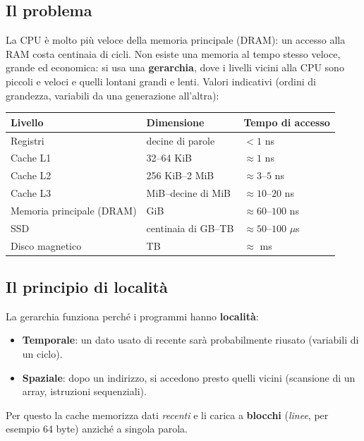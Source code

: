 \subsection{Il problema}
La CPU è molto più veloce della memoria principale (DRAM): un accesso alla RAM costa centinaia di cicli. Non esiste una memoria al tempo stesso veloce, grande ed economica: si usa una \textbf{gerarchia}, dove i livelli vicini alla CPU sono piccoli e veloci e quelli lontani grandi e lenti. Valori indicativi (ordini di grandezza, variabili da una generazione all'altra):
\begin{center}
\small
\begin{tabular}{@{}lll@{}}
\toprule
\textbf{Livello} & \textbf{Dimensione} & \textbf{Tempo di accesso} \\
\midrule
Registri & decine di parole & $< 1$ ns \\
Cache L1 & 32--64 KiB & $\approx 1$ ns \\
Cache L2 & 256 KiB--2 MiB & $\approx 3$--$5$ ns \\
Cache L3 & MiB--decine di MiB & $\approx 10$--$20$ ns \\
Memoria principale (DRAM) & GiB & $\approx 60$--$100$ ns \\
SSD & centinaia di GB--TB & $\approx 50$--$100$ $\mu$s \\
Disco magnetico & TB & $\approx$ ms \\
\bottomrule
\end{tabular}
\end{center}

\subsection{Il principio di località}
La gerarchia funziona perché i programmi hanno \textbf{località}:
\begin{itemize}
    \item \textbf{Temporale}: un dato usato di recente sarà probabilmente riusato (variabili di un ciclo).
    \item \textbf{Spaziale}: dopo un indirizzo, si accedono presto quelli vicini (scansione di un array, istruzioni sequenziali).
\end{itemize}
Per questo la cache memorizza dati \emph{recenti} e li carica a \textbf{blocchi} (\emph{linee}, per esempio 64 byte) anziché a singola parola.

